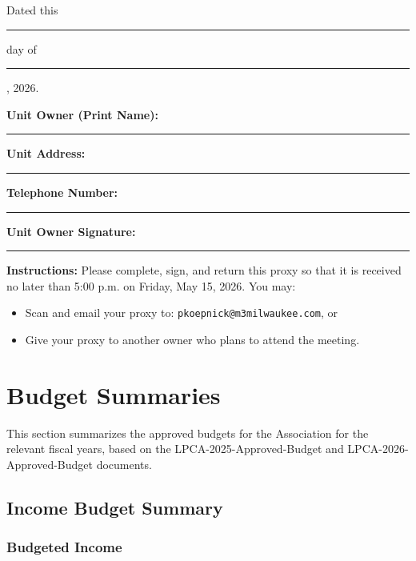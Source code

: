 \documentclass[11pt]{article}
\newcommand{\strong}[1]{\textbf{#1}}
\begin{document}
\vspace{1.5em}

\noindent
Dated this \rule{1.5cm}{0.4pt} day of \rule{3cm}{0.4pt}, 2026.

\vspace{1.5em}

\noindent
\strong{Unit Owner (Print Name):} \rule{3.5in}{0.4pt}

\vspace{1em}

\noindent
\strong{Unit Address:} \rule{4in}{0.4pt}

\vspace{1em}

\noindent
\strong{Telephone Number:} \rule{2.5in}{0.4pt}

\vspace{1em}

\noindent
\strong{Unit Owner Signature:} \rule{3.5in}{0.4pt}

\vspace{1.5em}

\noindent
\textbf{Instructions:} Please complete, sign, and return this proxy so that it is received
no later than 5{:}00 p.m. on Friday, May 15, 2026. You may:
\begin{itemize}[leftmargin=1.1em]
    \item Scan and email your proxy to: \texttt{pkoepnick@m3milwaukee.com}, or
    \item Give your proxy to another owner who plans to attend the meeting.
\end{itemize}

\vfill
\newpage

\section{Budget Summaries}

This section summarizes the approved budgets for the Association for the relevant fiscal
years, based on the LPCA-2025-Approved-Budget and LPCA-2026-Approved-Budget documents.

\subsection{Income Budget Summary}

\subsubsection*{Budgeted Income}
\vspace{-0.6em}
\end{document}
